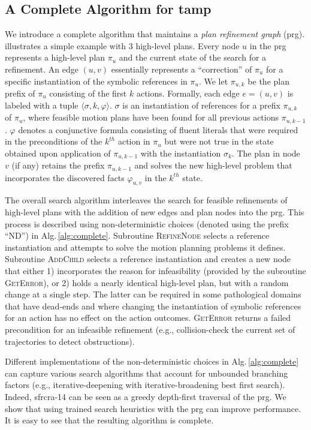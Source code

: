 \subsection{A Complete Algorithm for {\sc tamp}}
We introduce a complete algorithm that maintains a \emph{plan
  refinement graph} ({\sc prg}).  illustrates a simple
example with 3 high-level plans.  Every node $u$ in the {\sc prg} represents
a high-level plan $\pi_u$ and the current state of the search for a
refinement. An edge $(u,v)$ essentially represents a ``correction'' of
$\pi_u$ for a specific instantiation of the symbolic references in
$\pi_u$. We let $\pi_{u,k}$ be the plan prefix of $\pi_u$ consisting
of the first $k$ actions. Formally, each edge $e=(u,v)$ is labeled
with a tuple $\langle \sigma, k, \varphi \rangle$.  $\sigma$ is an
instantiation of references for a prefix $\pi_{u,k}$ of $\pi_u$, where
feasible motion plans have been found for all previous actions
$\pi_{u,k-1}$. $\varphi$ denotes a conjunctive formula consisting of
fluent literals that were required in the preconditions of the
$k^{th}$ action in $\pi_u$ but were not true in the state obtained
upon application of $\pi_{u,k-1}$ with the instantiation $\sigma_k$.
The plan in node $v$ (if any) retains the prefix $\pi_{u,k-1}$ and
solves the new high-level problem that incorporates the discovered
facts $\varphi_{u,v}$ in the $k^{th}$ state.

The overall search algorithm interleaves the search for feasible
refinements of high-level plans with the addition of new edges and plan
nodes into the {\sc prg}. This process is described using
non-deterministic choices (denoted using the prefix ``ND'') in
Alg.\,\ref{alg:complete}. Subroutine \textsc{RefineNode} selects a
reference instantiation and attempts to solve the motion planning
problems it defines. Subroutine \textsc{AddChild} selects a reference
instantiation and creates a new node that either 1) incorporates the
reason for infeasibility (provided by the subroutine
\textsc{GetError}), or 2) holds a nearly identical high-level plan,
but with a random change at a single step.  The latter can be required
in some pathological domains that have dead-ends and where changing
the instantiation of symbolic references for an action has no effect
on the action outcomes. \textsc{GetError} returns a failed
precondition for an infeasible refinement (e.g., collision-check
the current set of trajectories to detect obstructions).

Different implementations of the non-deterministic choices in
Alg.\,\ref{alg:complete} can capture various search algorithms that
account for unbounded branching factors (e.g., iterative-deepening
with iterative-broadening best first search). Indeed, {\sc sfrcra-14}
can be seen as a greedy depth-first traversal of the {\sc prg}. We
show that using trained search heuristics with the {\sc prg} can
improve performance. It is easy to see that the resulting algorithm is
complete.

